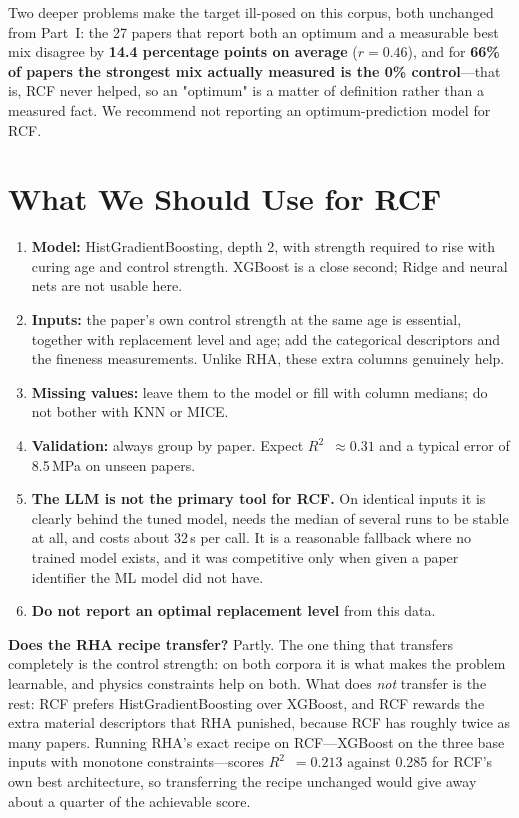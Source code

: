 \documentclass[11pt]{article}
\newcommand{\R}{$R^2$}
\begin{document}
Two deeper problems make the target ill-posed on this corpus, both unchanged from Part~I:
the 27 papers that report both an optimum and a measurable best mix disagree by
\textbf{14.4 percentage points on average} ($r=0.46$), and for \textbf{66\% of papers the
strongest mix actually measured is the 0\% control}---that is, RCF never helped, so an
"optimum" is a matter of definition rather than a measured fact. We recommend not
reporting an optimum-prediction model for RCF.

\section{What We Should Use for RCF}
\label{sec:rcf-p3-reco}
\begin{enumerate}\itemsep2pt
  \item \textbf{Model:} HistGradientBoosting, depth 2, with strength required to rise with
        curing age and control strength. XGBoost is a close second; Ridge and neural nets
        are not usable here.
  \item \textbf{Inputs:} the paper's own control strength at the same age is essential,
        together with replacement level and age; add the categorical descriptors and the
        fineness measurements. Unlike RHA, these extra columns genuinely help.
  \item \textbf{Missing values:} leave them to the model or fill with column medians;
        do not bother with KNN or MICE.
  \item \textbf{Validation:} always group by paper. Expect \R{}~$\approx0.31$ and a
        typical error of 8.5\,MPa on unseen papers.
  \item \textbf{The LLM is not the primary tool for RCF.} On identical inputs it is
        clearly behind the tuned model, needs the median of several runs to be stable at
        all, and costs about 32\,s per call. It is a reasonable fallback where no trained
        model exists, and it was competitive only when given a paper identifier the ML
        model did not have.
  \item \textbf{Do not report an optimal replacement level} from this data.
\end{enumerate}

\noindent \textbf{Does the RHA recipe transfer?} Partly. The one thing that transfers
completely is the control strength: on both corpora it is what makes the problem
learnable, and physics constraints help on both. What does \emph{not} transfer is the
rest: RCF prefers HistGradientBoosting over XGBoost, and RCF rewards the extra material
descriptors that RHA punished, because RCF has roughly twice as many papers. Running
RHA's exact recipe on RCF---XGBoost on the three base inputs with monotone
constraints---scores \R{}~$=0.213$ against 0.285 for RCF's own best architecture, so
transferring the recipe unchanged would give away about a quarter of the achievable
score.
\end{document}
